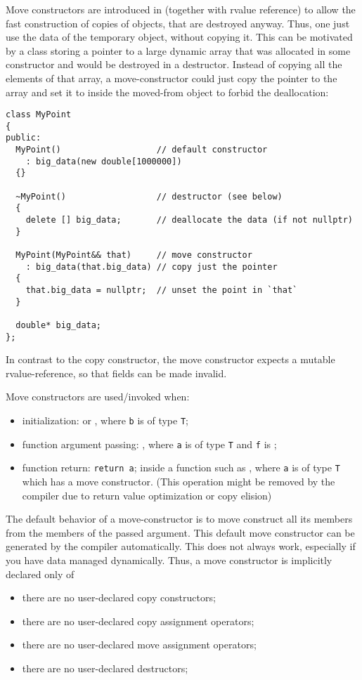 Move constructors are introduced in  (together with rvalue reference) to allow the fast construction of copies of objects, that are destroyed anyway.
Thus, one just use the data of the temporary object, without copying it. This can be motivated by a class storing a pointer to a large dynamic array
that was allocated in some constructor and would be destroyed in a destructor. Instead of copying all the elements of that array, a move-constructor
could just copy the pointer to the array and set it to  inside the moved-from object to forbid the deallocation:
%
\begin{verbatim}
class MyPoint
{
public:
  MyPoint()                   // default constructor
    : big_data(new double[1000000])
  {}

  ~MyPoint()                  // destructor (see below)
  {
    delete [] big_data;       // deallocate the data (if not nullptr)
  }

  MyPoint(MyPoint&& that)     // move constructor
    : big_data(that.big_data) // copy just the pointer
  {
    that.big_data = nullptr;  // unset the point in `that`
  }

  double* big_data;
};
\end{verbatim}
%
In contrast to the copy constructor, the move constructor expects a mutable rvalue-reference, so that fields can be made invalid.

Move constructors are used/invoked when:
\begin{itemize}
  \item initialization:  or , where \texttt{b} is of type \texttt{T};
  \item function argument passing: , where \texttt{a} is of type \texttt{T} and \texttt{f} is ;
  \item function return: \texttt{return a}; inside a function such as , where \texttt{a} is of type \texttt{T} which has a move constructor. (This operation might be removed by the compiler due to return value optimization or copy elision)
\end{itemize}

The default behavior of a move-constructor is to move construct all its members from the members of the passed argument. This default move constructor
can be generated by the compiler automatically. This does not always work, especially if you have data managed dynamically. Thus, a move constructor is
implicitly declared only of
\begin{itemize}
  \item there are no user-declared copy constructors;
  \item there are no user-declared copy assignment operators;
  \item there are no user-declared move assignment operators;
  \item there are no user-declared destructors;
\end{itemize}

